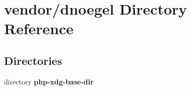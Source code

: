 \section{vendor/dnoegel Directory Reference}
\label{dir_91f1c753b6809aad88b85db2cc8e12e1}
\subsection*{Directories}
\begin{DoxyCompactItemize}
\item 
directory {\bf php-\/xdg-\/base-\/dir}
\end{DoxyCompactItemize}
